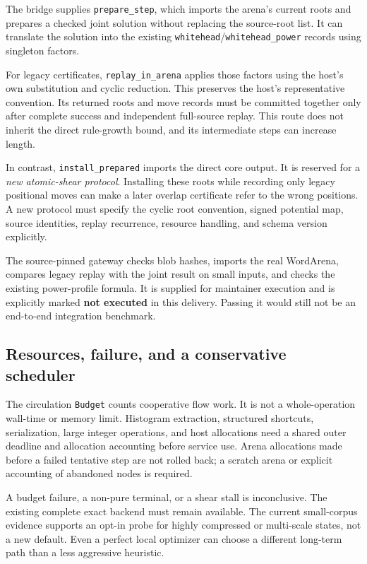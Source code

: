 \documentclass[11pt,letterpaper]{article}
\theoremstyle{definition}
\theoremstyle{remark}\newtheorem{remark}[theorem]{Remark}
\newcommand{\code}[1]{\texttt{#1}}
\begin{document}
The bridge supplies \code{prepare\_step}, which imports the arena's current
roots and prepares a checked joint solution without replacing the source-root
list. It can translate the solution into the existing
\code{whitehead}/\code{whitehead\_power} records using singleton factors.

For legacy certificates, \code{replay\_in\_arena} applies those factors using
the host's own substitution and cyclic reduction. This preserves the host's
representative convention. Its returned roots and move records must be
committed together only after complete success and independent full-source
replay. This route does not inherit the direct rule-growth bound, and its
intermediate steps can increase length.

In contrast, \code{install\_prepared} imports the direct core output. It is
reserved for a \emph{new atomic-shear protocol}. Installing these roots while
recording only legacy positional moves can make a later overlap certificate
refer to the wrong positions. A new protocol must specify the cyclic root
convention, signed potential map, source identities, replay recurrence,
resource handling, and schema version explicitly.

The source-pinned gateway checks blob hashes, imports the real WordArena,
compares legacy replay with the joint result on small inputs, and checks the
existing power-profile formula. It is supplied for maintainer execution and
is explicitly marked \textbf{not executed} in this delivery. Passing it would
still not be an end-to-end integration benchmark.

\subsection{Resources, failure, and a conservative scheduler}

The circulation \code{Budget} counts cooperative flow work. It is not a
whole-operation wall-time or memory limit. Histogram extraction, structured
shortcuts, serialization, large integer operations, and host allocations
need a shared outer deadline and allocation accounting before service use.
Arena allocations made before a failed tentative step are not rolled back;
a scratch arena or explicit accounting of abandoned nodes is required.

A budget failure, a non-pure terminal, or a shear stall is inconclusive.
The existing complete exact backend must remain available. The current
small-corpus evidence supports an opt-in probe for highly compressed or
multi-scale states, not a new default. Even a perfect local optimizer can
choose a different long-term path than a less aggressive heuristic.
\end{document}
